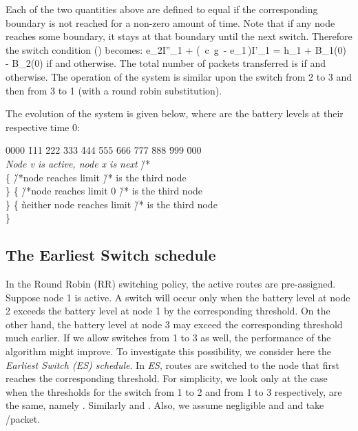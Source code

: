 \documentclass[12 pt]{article}
\newcommand{\debug}[1]{\mbox{\tt #1}}
\renewcommand{\debug}[1]{}              \newcommand{\cmd}[1]{}
\newcommand{\daddcontentsline}[3]{\addcontentsline{#1}{#2}{#3}}
\newcommand{\EE}[1]{ \debug{\fbox{\sname #1}}\label{\sname #1} \cmd{EAB}}
\newcommand{\prntvar}{\verb + itemsep = + \the\itemsep \verb + leftmargin = + \the\leftmargin \verb + leftskip = + \the\leftskip \verb + parindent = + \the\parindent \verb + leftmargini = + \the\leftmargini}
\renewcommand{\prntvar}{}
\newcommand{\msubsection}[2]{\subsection[#1 \debug{\fbox {#2}}]
	{#1 \cmd{msubsection} \dlabelx{#2}}\markboth{\today}{Sec. \thesection}}
\begin{document}
Each of the two quantities above are defined to equal  if the corresponding boundary is not reached for a non-zero amount of time.  Note that if any node reaches some boundary, it stays at that boundary until the next switch.
Therefore the switch condition () becomes:
\EB
e_2\cdot I''_1 + (\, c\, g\, - e_1\,)I'_1 = h_1 + B_1(0) - B_2(0)
\EE{eq-swCC3}
if  and  otherwise.
The  total number of packets transferred  is  if  and  otherwise.
The operation of the system is similar upon the switch from 2 to 3 and then from 3 to 1 (with a round robin substitution).


The evolution of the system is given below, where  are the battery levels at their respective time 0:

\vspace{1cm}



\renewcommand{\pname}{X3}\daddcontentsline{lot}{table}{\debug{\fbox{\pname}}}



\begin{minipage}{\textwidtha}\setcounter{line}{0}\begin{tabbing}0000\debug{000} \= 111 \= 222 \= 333 \= 444 \= 555 \= 666 \= 777
\= 888 \= 999 \= 000 \kill
\prntvar\\{\em Node v is active, node x is next} \` /*  \\
\> 
\> \{   \` /*node  reaches limit 
\>\>		
\>\>		
\>\>      
\>\>      \`/*  is the third node
\>\>       \\
	\>\>	\}
\>\{   \`/*node  reaches limit 0
\2        
\3        
\3        
\3        \`/*  is the third node
\3         \\
    \2       \}
\> \{      \` neither node reaches limit
\3            
\3            
\3            \`/*  is the third node
\3             \\
    \2       \} \\



\end{tabbing}
\end{minipage}




\msubsection{The Earliest Switch schedule}{ES}

In the Round Robin (RR) switching policy, the active routes are pre-assigned.  Suppose node 1 is active.  A switch will occur only when the battery level at node 2 exceeds the battery level at node 1 by the corresponding threshold.  On the other hand, the battery level at node 3 may exceed the corresponding threshold much earlier.  If we allow switches from 1 to 3 as well, the performance of the algorithm might improve.  To investigate this possibility, we consider here the \emph{Earliest Switch (ES) schedule}.  In \emph{ES}, routes are switched to the node that first reaches the corresponding threshold.  For simplicity, we look only at the case when the thresholds  for the switch from 1 to 2 and from 1 to 3 respectively, are the same, namely .  Similarly  and
.  Also, we assume negligible  and  and take /packet.
\end{document}
